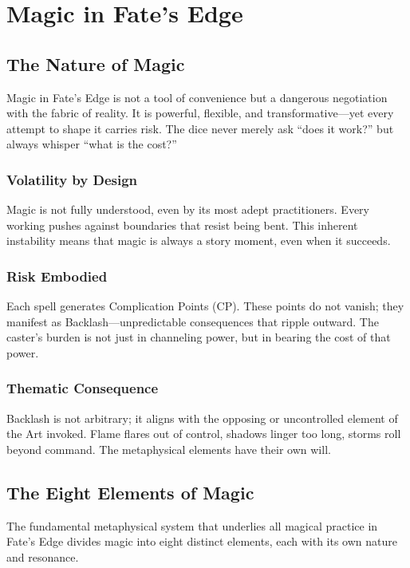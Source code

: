 \documentclass[11pt]{report}
\begin{document}
\chapter{Magic in Fate's Edge}

\section{The Nature of Magic}

Magic in Fate's Edge is not a tool of convenience but a dangerous negotiation with the fabric of reality. It is powerful, flexible, and transformative—yet every attempt to shape it carries risk. The dice never merely ask ``does it work?'' but always whisper ``what is the cost?''

\subsection{Volatility by Design}
Magic is not fully understood, even by its most adept practitioners. Every working pushes against boundaries that resist being bent. This inherent instability means that magic is always a story moment, even when it succeeds.

\subsection{Risk Embodied}
Each spell generates Complication Points (CP). These points do not vanish; they manifest as Backlash—unpredictable consequences that ripple outward. The caster's burden is not just in channeling power, but in bearing the cost of that power.

\subsection{Thematic Consequence}
Backlash is not arbitrary; it aligns with the opposing or uncontrolled element of the Art invoked. Flame flares out of control, shadows linger too long, storms roll beyond command. The metaphysical elements have their own will.

\section{The Eight Elements of Magic}

The fundamental metaphysical system that underlies all magical practice in Fate's Edge divides magic into eight distinct elements, each with its own nature and resonance.
\end{document}
